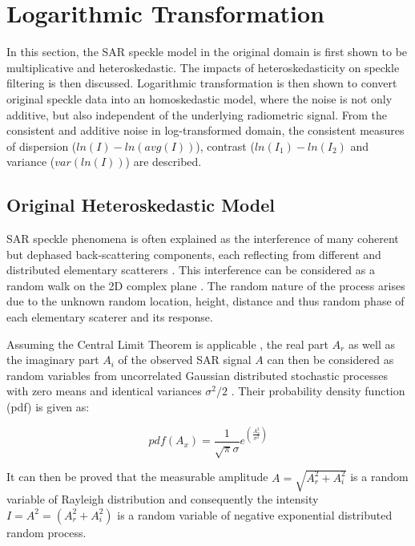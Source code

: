 \documentclass[journal]{IEEEtran}
\begin{document}
\section{Logarithmic Transformation}
\label{sec:log_transform}

In 
this section, the SAR speckle model in the original domain is first shown to be multiplicative and heteroskedastic.
The impacts of heteroskedasticity on speckle filtering is then discussed.
Logarithmic transformation is then shown to convert original speckle data into an homoskedastic model, 
	where the noise is not only additive, but also independent of the underlying radiometric signal.
From the consistent and additive noise in log-transformed domain,
    the consistent measures of dispersion ($ln(I)-ln(avg(I))$), contrast ($ln(I_1)-ln(I_2)$ and 
	variance ($var(ln(I))$) are described.

\subsection{Original Heteroskedastic Model}

SAR speckle phenomena is often explained as the interference of many coherent but dephased back-scattering components,
	each reflecting from different and distributed elementary scatterers \cite{Oliver_ProcIEEE_1963, 
	Leith_ProcIEEE_1971}. This interference can be considered as a random walk on the 2D complex plane 
	\cite{Goodman_JOptSocAm_76}.  The random nature of the process arises due to the unknown random location, 
	height, distance and thus random phase of each elementary scaterer and its response.

Assuming the Central Limit Theorem is applicable \cite{Goodman_Springer_1975}, the real part $A_r$ as well as 
the imaginary part $A_i$ of the observed SAR signal $A$ can then be considered as random variables from 
uncorrelated Gaussian distributed stochastic processes with zero means and 
identical variances $\sigma^2/2$  \cite{Lee_CRCPress_2009}. Their probability density function (pdf) is given as:

\begin{equation}
\label{eqn:component_signal_pdf}
pdf(A_x)=\frac{1}{\sqrt{\pi} \sigma} e^{\left( \frac{A_x^2}{\sigma^2} \right) }
\end{equation}

It can then be proved that the measurable amplitude $A=\sqrt{A_r^2+A_i^2}$ is a random variable of Rayleigh 
distribution and consequently the intensity $I=A^2=(A_r^2+A_i^2)$ is a random variable of negative exponential 
distributed random process.
\end{document}
